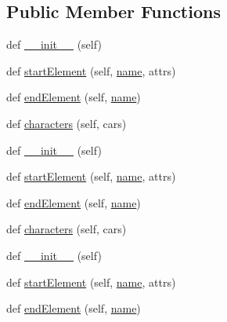 \subsection*{Public Member Functions}
\begin{DoxyCompactItemize}
\item 
def \hyperlink{classwaflib_1_1_tools_1_1qt4_1_1_x_m_l_handler_a5090e66a9c76416e54d5865ed285df61}{\+\_\+\+\_\+init\+\_\+\+\_\+} (self)
\item 
def \hyperlink{classwaflib_1_1_tools_1_1qt4_1_1_x_m_l_handler_a4900b3c2d71e27909fd142618371e0dd}{start\+Element} (self, \hyperlink{lib_2expat_8h_a1b49b495b59f9e73205b69ad1a2965b0}{name}, attrs)
\item 
def \hyperlink{classwaflib_1_1_tools_1_1qt4_1_1_x_m_l_handler_a3ca61314858104050be53bd23a672e74}{end\+Element} (self, \hyperlink{lib_2expat_8h_a1b49b495b59f9e73205b69ad1a2965b0}{name})
\item 
def \hyperlink{classwaflib_1_1_tools_1_1qt4_1_1_x_m_l_handler_acdb9a245e889b637bb45442c4be487d1}{characters} (self, cars)
\item 
def \hyperlink{classwaflib_1_1_tools_1_1qt4_1_1_x_m_l_handler_a5090e66a9c76416e54d5865ed285df61}{\+\_\+\+\_\+init\+\_\+\+\_\+} (self)
\item 
def \hyperlink{classwaflib_1_1_tools_1_1qt4_1_1_x_m_l_handler_a4900b3c2d71e27909fd142618371e0dd}{start\+Element} (self, \hyperlink{lib_2expat_8h_a1b49b495b59f9e73205b69ad1a2965b0}{name}, attrs)
\item 
def \hyperlink{classwaflib_1_1_tools_1_1qt4_1_1_x_m_l_handler_a3ca61314858104050be53bd23a672e74}{end\+Element} (self, \hyperlink{lib_2expat_8h_a1b49b495b59f9e73205b69ad1a2965b0}{name})
\item 
def \hyperlink{classwaflib_1_1_tools_1_1qt4_1_1_x_m_l_handler_acdb9a245e889b637bb45442c4be487d1}{characters} (self, cars)
\item 
def \hyperlink{classwaflib_1_1_tools_1_1qt4_1_1_x_m_l_handler_a5090e66a9c76416e54d5865ed285df61}{\+\_\+\+\_\+init\+\_\+\+\_\+} (self)
\item 
def \hyperlink{classwaflib_1_1_tools_1_1qt4_1_1_x_m_l_handler_a4900b3c2d71e27909fd142618371e0dd}{start\+Element} (self, \hyperlink{lib_2expat_8h_a1b49b495b59f9e73205b69ad1a2965b0}{name}, attrs)
\item 
def \hyperlink{classwaflib_1_1_tools_1_1qt4_1_1_x_m_l_handler_a3ca61314858104050be53bd23a672e74}{end\+Element} (self, \hyperlink{lib_2expat_8h_a1b49b495b59f9e73205b69ad1a2965b0}{name})
\item 

\end{DoxyCompactItemize}
